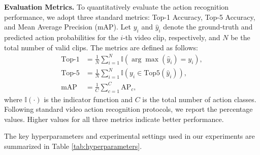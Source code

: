 \documentclass[lettersize,journal]{IEEEtran}
\begin{document}
\textbf{Evaluation Metrics.} To quantitatively evaluate the action recognition performance, we adopt three standard metrics: Top-1 Accuracy, Top-5 Accuracy, and Mean Average Precision (mAP). Let $y_i$ and $\hat{y}_i$ denote the ground-truth and predicted action probabilities for the $i$-th video clip, respectively, and $N$ be the total number of valid clips. The metrics are defined as follows:
\begin{align}
\text{Top-1} &= \frac{1}{N} \sum_{i=1}^{N} \mathbb{I}(\arg\max(\hat{y}_i) = y_i), \\
\text{Top-5} &= \frac{1}{N} \sum_{i=1}^{N} \mathbb{I}(y_i \in \text{Top5}(\hat{y}_i)), \\
\text{mAP} &= \frac{1}{C} \sum_{c=1}^{C} \text{AP}_c,
\end{align}
where $\mathbb{I}(\cdot)$ is the indicator function and $C$ is the total number of action classes. Following standard video action recognition protocols, we report the percentage values. Higher values for all three metrics indicate better performance.

The key hyperparameters and experimental settings used in our experiments are summarized in Table \ref{tab:hyperparameters}.

\begin{table}[t]
\centering
\caption{Summary of Key Training Hyperparameters and Settings}
\label{tab:hyperparameters}
\end{table}
\end{document}
